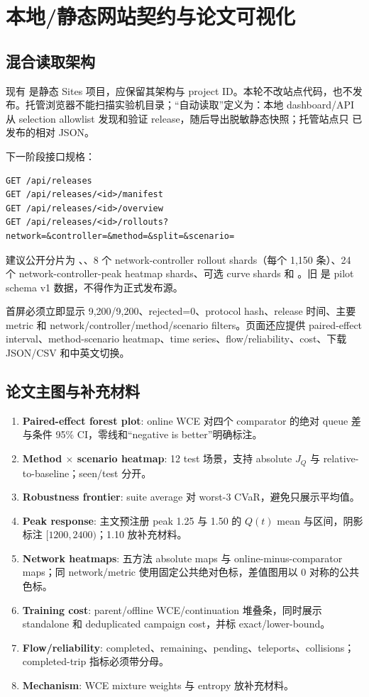 \chapter{本地/静态网站契约与论文可视化}

\section{混合读取架构}
现有  是静态 Sites 项目，应保留其架构与 project ID。本轮不改站点代码，也不发布。托管浏览器不能扫描实验机目录；“自动读取”定义为：本地 dashboard/API 从 selection allowlist 发现和验证 release，随后导出脱敏静态快照；托管站点只  已发布的相对 JSON。

下一阶段接口规格：
\begin{Verbatim}[fontsize=\small,breaklines=true]
GET /api/releases
GET /api/releases/<id>/manifest
GET /api/releases/<id>/overview
GET /api/releases/<id>/rollouts?network=&controller=&method=&split=&scenario=
\end{Verbatim}

建议公开分片为 、、8 个 network-controller rollout shards（每个 1,150 条）、24 个 network-controller-peak heatmap shards、可选 curve shards 和 。旧  是 pilot schema v1 数据，不得作为正式发布源。

首屏必须立即显示 9,200/9,200、rejected=0、protocol hash、release 时间、主要 metric 和 network/controller/method/scenario filters。页面还应提供 paired-effect interval、method-scenario heatmap、time series、flow/reliability、cost、下载 JSON/CSV 和中英文切换。

\section{论文主图与补充材料}
\begin{enumerate}
  \item \textbf{Paired-effect forest plot}: online WCE 对四个 comparator 的绝对 queue 差与条件 95\% CI，零线和“negative is better”明确标注。
  \item \textbf{Method $\times$ scenario heatmap}: 12 test 场景，支持 absolute $J_Q$ 与 relative-to-baseline；seen/test 分开。
  \item \textbf{Robustness frontier}: suite average 对 worst-3 CVaR，避免只展示平均值。
  \item \textbf{Peak response}: 主文预注册 peak 1.25 与 1.50 的 $Q(t)$ mean 与区间，阴影标注 $[1200,2400)$；1.10 放补充材料。
  \item \textbf{Network heatmaps}: 五方法 absolute maps 与 online-minus-comparator maps；同 network/metric 使用固定公共绝对色标，差值图用以 0 对称的公共色标。
  \item \textbf{Training cost}: parent/offline WCE/continuation 堆叠条，同时展示 standalone 和 deduplicated campaign cost，并标 exact/lower-bound。
  \item \textbf{Flow/reliability}: completed、remaining、pending、teleports、collisions；completed-trip 指标必须带分母。
  \item \textbf{Mechanism}: WCE mixture weights 与 entropy 放补充材料。
\end{enumerate}

